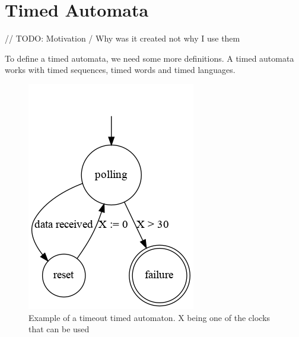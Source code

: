 \documentclass[12pt]{article}
\theoremstyle{definition}
\theoremstyle{definition}
\theoremstyle{remark}
\begin{document}
%
%
%



\section{Timed Automata}


// TODO: Motivation / Why was it created not why I use them

To define a timed automata, we need some more definitions. A timed automata works with timed sequences, timed words and timed languages.\\

\begin{figure}[H]
    \centering
    \includegraphics[scale=0.8]{timed_automata.png}
    \caption{Example of a timeout timed automaton. X being one of the clocks that can be used}
    \label{timed_automata_e1}
\end{figure}
\end{document}
